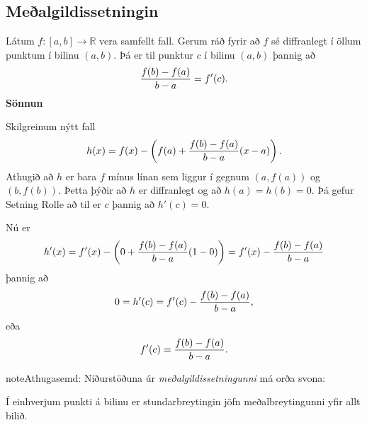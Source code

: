 \documentclass[a4paper,10pt,icelandic]{sphinxmanual}
\begin{document}

\subsection{Meðalgildissetningin}
\label{kafli03:id13}\label{kafli03:index-7}
Látum \(f:[a,b]\rightarrow{{\mathbb  R}}\) vera samfellt fall. Gerum
ráð fyrir að \(f\) sé diffranlegt í öllum punktum í bilinu
\((a,b)\). Þá er til punktur \(c\) í bilinu \((a,b)\) þannig
að
\begin{gather}
\begin{split}\frac{f(b)-f(a)}{b-a}=f'(c).\end{split}\notag
\end{gather}
\textbf{Sönnun}

Skilgreinum nýtt fall
\begin{gather}
\begin{split}h(x)=f(x)-\left(f(a)+ \frac{f(b)-f(a)}{b-a}(x-a)\right).\end{split}\notag
\end{gather}
Athugið að \(h\) er bara \(f\) mínus línan sem liggur í gegnum
\((a,f(a))\) og \((b,f(b))\). Þetta þýðir að \(h\) er diffranlegt
og að \(h(a)=h(b)=0\). Þá gefur Setning Rolle að til er \(c\) þannig að
\(h'(c)=0\).

Nú er
\begin{gather}
\begin{split}h'(x) = f'(x) - \left(0+\frac{f(b)-f(a)}{b-a}(1-0)\right)
= f'(x) - \frac{f(b)-f(a)}{b-a}\end{split}\notag
\end{gather}
þannig að
\begin{gather}
\begin{split}0 = h'(c) = f'(c) - \frac{f(b)-f(a)}{b-a},\end{split}\notag
\end{gather}
eða
\begin{gather}
\begin{split}f'(c) = \frac{f(b)-f(a)}{b-a}.\end{split}\notag
\end{gather}
\begin{notice}{note}{Athugasemd:}
Niðurstöðuna úr \textit{meðalgildissetningunni} má orða svona:

Í einhverjum punkti á bilinu er stundarbreytingin jöfn meðalbreytingunni
yfir allt bilið.
\end{notice}

\end{document}
